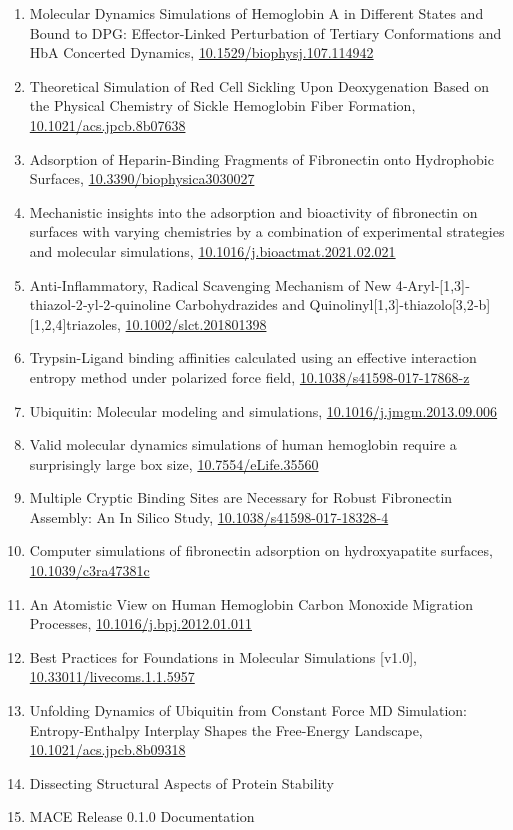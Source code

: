 \begin{enumerate}
    \item Molecular Dynamics Simulations of Hemoglobin A in Different States and Bound to DPG: Effector-Linked Perturbation of Tertiary Conformations and HbA Concerted Dynamics, \url{10.1529/biophysj.107.114942}
    \item Theoretical Simulation of Red Cell Sickling Upon Deoxygenation Based on the Physical Chemistry of Sickle Hemoglobin Fiber Formation, \url{10.1021/acs.jpcb.8b07638}
    \item Adsorption of Heparin-Binding Fragments of Fibronectin onto Hydrophobic Surfaces, \url{10.3390/biophysica3030027}
    \item Mechanistic insights into the adsorption and bioactivity of fibronectin on surfaces with varying chemistries by a combination of experimental strategies and molecular simulations, \url{10.1016/j.bioactmat.2021.02.021}
    \item Anti‐Inflammatory, Radical Scavenging Mechanism of New 4‐Aryl‐[1,3]‐thiazol‐2‐yl‐2‐quinoline Carbohydrazides and Quinolinyl[1,3]‐thiazolo[3,2‐b][1,2,4]triazoles, \url{10.1002/slct.201801398}
    \item Trypsin-Ligand binding affinities calculated using an effective interaction entropy method under polarized force field, \url{10.1038/s41598-017-17868-z}
    \item Ubiquitin: Molecular modeling and simulations, \url{10.1016/j.jmgm.2013.09.006}
    \item Valid molecular dynamics simulations of human hemoglobin require a surprisingly large box size, \url{10.7554/eLife.35560} 
    \item Multiple Cryptic Binding Sites are Necessary for Robust Fibronectin Assembly: An In Silico Study, \url{10.1038/s41598-017-18328-4} 
    \item Computer simulations of fibronectin adsorption on hydroxyapatite surfaces, \url{10.1039/c3ra47381c}
    \item An Atomistic View on Human Hemoglobin Carbon Monoxide Migration Processes, \url{10.1016/j.bpj.2012.01.011}
    \item Best Practices for Foundations in Molecular Simulations [v1.0], \url{10.33011/livecoms.1.1.5957}
    \item Unfolding Dynamics of Ubiquitin from Constant Force MD Simulation: Entropy-Enthalpy Interplay Shapes the Free-Energy Landscape, \url{10.1021/acs.jpcb.8b09318}
    \item Dissecting Structural Aspects of Protein Stability
    \item MACE Release 0.1.0 Documentation
\end{enumerate}